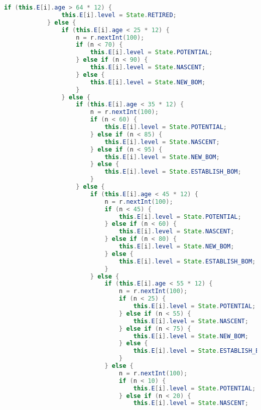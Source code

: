 \begin{lstlisting}[language=Java, caption=CA.java]
            if (this.E[i].age > 64 * 12) {
                this.E[i].level = State.RETIRED;
            } else {
                if (this.E[i].age < 25 * 12) {
                    n = r.nextInt(100);
                    if (n < 70) {
                        this.E[i].level = State.POTENTIAL;
                    } else if (n < 90) {
                        this.E[i].level = State.NASCENT;
                    } else {
                        this.E[i].level = State.NEW_BOM;
                    }
                } else {
                    if (this.E[i].age < 35 * 12) {
                        n = r.nextInt(100);
                        if (n < 60) {
                            this.E[i].level = State.POTENTIAL;
                        } else if (n < 85) {
                            this.E[i].level = State.NASCENT;
                        } else if (n < 95) {
                            this.E[i].level = State.NEW_BOM;
                        } else {
                            this.E[i].level = State.ESTABLISH_BOM;
                        }
                    } else {
                        if (this.E[i].age < 45 * 12) {
                            n = r.nextInt(100);
                            if (n < 45) {
                                this.E[i].level = State.POTENTIAL;
                            } else if (n < 60) {
                                this.E[i].level = State.NASCENT;
                            } else if (n < 80) {
                                this.E[i].level = State.NEW_BOM;
                            } else {
                                this.E[i].level = State.ESTABLISH_BOM;
                            }
                        } else {
                            if (this.E[i].age < 55 * 12) {
                                n = r.nextInt(100);
                                if (n < 25) {
                                    this.E[i].level = State.POTENTIAL;
                                } else if (n < 55) {
                                    this.E[i].level = State.NASCENT;
                                } else if (n < 75) {
                                    this.E[i].level = State.NEW_BOM;
                                } else {
                                    this.E[i].level = State.ESTABLISH_BOM;
                                }
                            } else {
                                n = r.nextInt(100);
                                if (n < 10) {
                                    this.E[i].level = State.POTENTIAL;
                                } else if (n < 20) {
                                    this.E[i].level = State.NASCENT;

\end{lstlisting}
